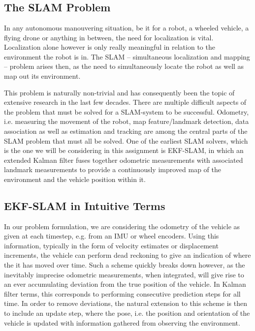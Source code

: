 \section{}
\subsection{The SLAM Problem}
In any autonomous manouvering situation, be it for a robot, a wheeled vehicle, a flying drone or anything in between, the need for localization is vital.
Localization alone however is only really meaningful in relation to the environment the robot is in.
The SLAM – simultaneous localization and mapping – problem arises then, as the need to simultaneously locate the robot as well as map out its environment.

This problem is naturally non-trivial and has consequently been the topic of extensive research in the last few decades.
There are multiple difficult aspects of the problem that must be solved for a SLAM-system to be successful.
Odometry, i.e. measuring the movement of the robot, map feature/landmark detection, data association as well as estimation and tracking are among the central parts of the SLAM problem that must all be solved.
One of the earliest SLAM solvers, which is the one we will be considering in this assignment is EKF-SLAM, in which an extended Kalman filter fuses together odometric measurements with associated landmark measurements to provide a continuously improved map of the environment and the vehicle position within it.

\subsection{EKF-SLAM in Intuitive Terms}
In our problem formulation, we are considering the odometry of the vehicle as given at each timestep, e.g. from an IMU or wheel encoders.
Using this information, typically in the form of velocity estimates or displacement increments, the vehicle can perform dead reckoning to give an indication of where the it has moved over time.
Such a scheme quickly breaks down however, as the inevitably imprecise odometric measurements, when integrated, will give rise to an ever accumulating deviation from the true position of the vehicle. In Kalman filter terms, this corresponds to performing consecutive prediction steps for all time. In order to remove deviations, the natural extension to this scheme is then to include an update step, where the pose, i.e. the position and orientation of the vehicle is updated with information gathered from observing the environment.




